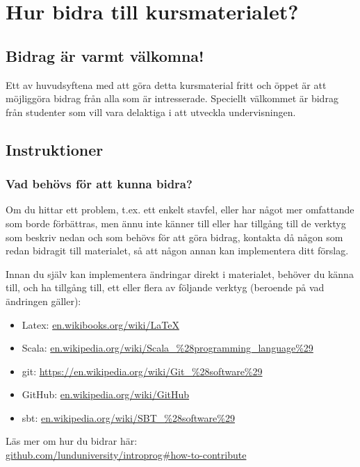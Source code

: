 
\chapter{Hur bidra till kursmaterialet?}\label{appendix:contrib}

\section{Bidrag är varmt välkomna!}

Ett av huvudsyftena med att göra detta kursmaterial fritt och öppet är att möjliggöra bidrag från alla som är intresserade. Speciellt välkommet är bidrag från studenter som vill vara delaktiga i att utveckla undervisningen.

\section{Instruktioner}

\subsection{Vad behövs för att kunna bidra?}

Om du hittar ett problem, t.ex. ett enkelt stavfel, eller har något mer omfattande som borde förbättras, men ännu inte känner till eller har tillgång till de verktyg som beskriv nedan och som behövs för att göra bidrag, kontakta då någon som redan bidragit till materialet, så att någon annan kan implementera ditt förslag.

Innan du själv kan implementera ändringar direkt i materialet, behöver du känna till, och ha tillgång  till, ett eller flera av följande verktyg (beroende på vad ändringen gäller):

\begin{itemize}[noitemsep]
\item Latex: \href{https://en.wikibooks.org/wiki/LaTeX}{en.wikibooks.org/wiki/LaTeX}
\item Scala: \href{https://en.wikipedia.org/wiki/Scala\_\%28programming_language\%29}{en.wikipedia.org/wiki/Scala\_\%28programming\_language\%29}
\item git: \href{https://en.wikipedia.org/wiki/Git\_\%28software\%29}{https://en.wikipedia.org/wiki/Git\_\%28software\%29}
\item GitHub: \href{https://en.wikipedia.org/wiki/GitHub}{en.wikipedia.org/wiki/GitHub}
\item sbt: \href{https://en.wikipedia.org/wiki/SBT\_\%28software\%29}{en.wikipedia.org/wiki/SBT\_\%28software\%29}
\end{itemize}
Läs mer om hur du bidrar här: \\ \href{https://github.com/lunduniversity/introprog#how-to-contribute}{github.com/lunduniversity/introprog\#how-to-contribute}



